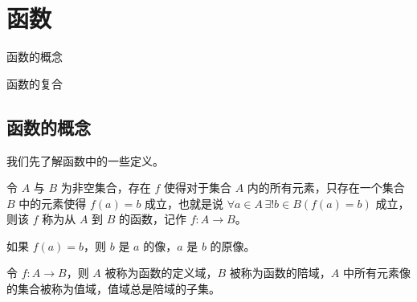 \section{函数}
\begin{introduction}
    \item 函数的概念
    \item 函数的复合
\end{introduction}

\subsection{函数的概念}
我们先了解函数中的一些定义。
\begin{definition}[函数的定义]\label{def:函数的定义}
    令 $A$ 与 $B$ 为非空集合，存在 $f$ 使得对于集合 $A$ 内的所有元素，只存在一个集合 $B$ 中的元素使得 $f(a) = b$ 成立，也就是说 $\forall a \in A \, \exists! b \in B(f(a)=b)$ 成立，则该 $f$ 称为从 $A$ 到 $B$ 的函数，记作 $f:A \to B$。
\end{definition}

\begin{definition}[像与原像]\label{def:像与原像}
    如果 $f(a) = b$，则 $b$ 是 $a$ 的像，$a$ 是 $b$ 的原像。
\end{definition}

\begin{definition}\label{def:定义域、陪域与值域}
    令 $f: A \to B$，则 $A$ 被称为函数的定义域，$B$ 被称为函数的陪域，$A$ 中所有元素像的集合被称为值域，值域总是陪域的子集。
\end{definition}